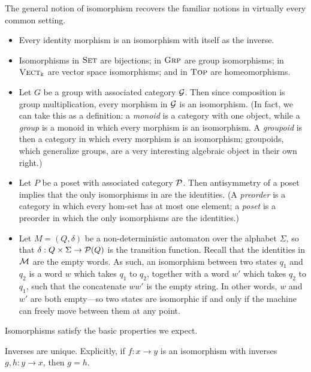 \begin{ex} The general notion of isomorphism recovers the familiar notions in
  virtually every common setting.
  \begin{itemize}
    \item Every identity morphism is an isomorphism with itself as the inverse.
    \item Isomorphisms in ${\textsc{\text{Set}}}$ are bijections; in ${\textsc{\text{Grp}}}$ are group
      isomorphisms; in ${\textsc{\text{Vect}}}_\Bbbk$ are vector space isomorphisms; and in
      ${\textsc{\text{Top}}}$ are homeomorphisms.
    \item Let $G$ be a group with associated category $\mathcal{G}$. Then since
      composition is group multiplication, every morphism in $\mathcal{G}$ is an
      isomorphism. (In fact, we can take this as a definition: a \emph{monoid} is a
      category with one object, while a \emph{group} is a monoid in which every
      morphism is an isomorphism. A \emph{groupoid} is then a category in which
      every morphism is an isomorphism; groupoids, which generalize groups, are a very interesting
      algebraic object in their own right.)
    \item Let $P$ be a poset with associated category $\mathcal{P}$. Then antisymmetry of
      a poset implies that the only isomorphisms in are the identities. (A
      \emph{preorder} is a category in which every hom-set has at most one
      element; a \emph{poset} is a preorder in which the only isomorphisms are
      the identities.)
    \item Let $M = (Q, \delta)$ be a non-deterministic automaton over the
      alphabet $\Sigma$, so that $\delta: Q\times \Sigma\to \mathcal{P}(Q)$ is the
      transition function. Recall that the identities in $\mathcal{M}$ are the empty
      words. As such, an isomorphism between two states $q_1$ and $q_2$ is a
      word $w$ which takes $q_1$ to $q_2$, together with a word $w'$ which takes
      $q_2$ to $q_1$, such that the concatenate $ww'$ is the empty string. In
      other words, $w$ and $w'$ are both empty---so two states are isomorphic if
      and only if the machine can freely move between them at any point.
  \end{itemize}
\end{ex}

Isomorphisms satisfy the basic properties we expect.

\begin{prop}
  Inverses are unique. Explicitly, if $f: x\to y$ is an isomorphism with
  inverses $g, h: y\to x$, then $g = h$.
\end{prop}

